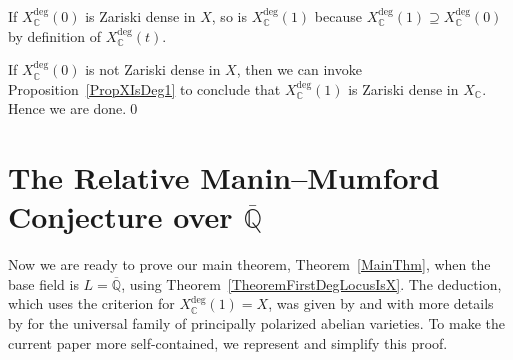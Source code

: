 \documentclass[12pt,oneside]{amsart}
\numberwithin{maincounter}{section}
\numberwithin{equation}{section}
\def\CC{\mathbb{C}}
\def\QQ{\mathbb{Q}}
\newcommand{\IC}{{\CC}}
\newcommand{\IQbar}{{\overline{\QQ}}}
\begin{document}
If $X_\IC^{\mathrm{deg}}(0)$ is Zariski dense in $X$, so is $X_\IC^{\mathrm{deg}}(1)$ because $X_\IC^{\mathrm{deg}}(1) \supseteq X_\IC^{\mathrm{deg}}(0)$ by definition of $X_\IC^{\mathrm{deg}}(t)$.%

If $X_\IC^{\mathrm{deg}}(0)$ is not Zariski dense in $X$, then we can
invoke Proposition~\ref{PropXIsDeg1} to conclude that
$X_\IC^{\mathrm{deg}}(1)$ is Zariski dense in $X_\IC$.
Hence we are done.\qed



\section{The Relative Manin--Mumford Conjecture over $\IQbar$}
\label{SectionConclusion}
Now we are ready to prove  our main theorem, Theorem~\ref{MainThm}, when the base field is $L=\IQbar$,
using Theorem~\ref{TheoremFirstDegLocusIsX}.
The deduction, which uses the criterion for $X_{\IC}^{\mathrm{deg}}(1) = X$, was given by \cite[Proposition 1.10]{GaoBettiRank} and with more details 
by \cite[Corollary 6.3]{GH:nondeg} for the universal family of
principally polarized abelian varieties.
To make the current paper more self-contained, we represent and simplify this proof.%
\end{document}
